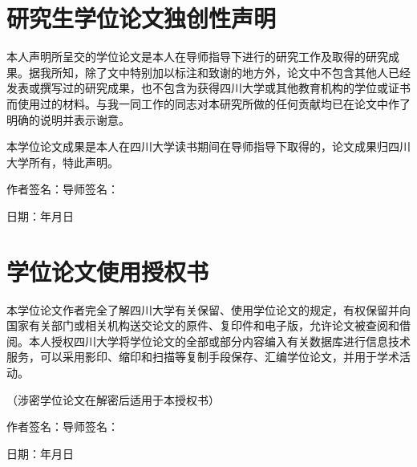 \chapter*{研究生学位论文独创性声明}
本人声明所呈交的学位论文是本人在导师指导下进行的研究工作及取得的研究成果。据我所知，除了文中特别加以标注和致谢的地方外，论文中不包含其他人已经发表或撰写过的研究成果，也不包含为获得四川大学或其他教育机构的学位或证书而使用过的材料。与我一同工作的同志对本研究所做的任何贡献均已在论文中作了明确的说明并表示谢意。

本学位论文成果是本人在四川大学读书期间在导师指导下取得的，论文成果归四川大学所有，特此声明。

\par\vspace{20bp}\noindent 作者签名：\hfill 导师签名：\hspace{20mm}
\par\vspace{20bp}\noindent 日期：\hfill 年\quad 月\quad 日\hspace{20mm}

\chapter*{学位论文使用授权书}
本学位论文作者完全了解四川大学有关保留、使用学位论文的规定，有权保留并向国家有关部门或相关机构送交论文的原件、复印件和电子版，允许论文被查阅和借阅。本人授权四川大学将学位论文的全部或部分内容编入有关数据库进行信息技术服务，可以采用影印、缩印和扫描等复制手段保存、汇编学位论文，并用于学术活动。

（涉密学位论文在解密后适用于本授权书）

\par\vspace{20bp}\noindent 作者签名：\hfill 导师签名：\hspace{20mm}
\par\vspace{20bp}\noindent 日期：\hfill 年\quad 月\quad 日\hspace{20mm}
